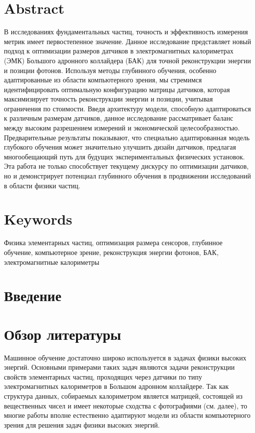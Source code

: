 \documentclass[a4paper,12pt]{extarticle}
\begin{document}
\section*{Abstract}   %
В исследованиях фундаментальных частиц, точность и эффективность измерения метрик имеет первостепенное значение. Данное исследование представляет новый подход к оптимизации размеров датчиков в электромагнитных калориметрах (ЭМК) Большого адронного коллайдера (БАК) для точной реконструкции энергии и позиции фотонов. Используя методы глубинного обучения, особенно адаптированные из области компьютерного зрения, мы стремимся идентифицировать оптимальную конфигурацию матрицы датчиков, которая максимизирует точность реконструкции энергии и позиции, учитывая ограничения по стоимости. Введя архитектуру модели, способную адаптироваться к различным размерам датчиков, данное исследование рассматривает баланс между высоким разрешением измерений и экономической целесообразностью. Предварительные результаты показывают, что специально адаптированная модель глубокого обучения может значительно улучшить дизайн датчиков, предлагая многообещающий путь для будущих экспериментальных физических установок. Эта работа не только способствует текущему дискурсу по оптимизации датчиков, но и демонстрирует потенциал глубинного обучения в продвижении исследований в области физики частиц.


\section*{Keywords}
Физика элементарных частиц, оптимизация размера сенсоров, глубинное обучение, компьютерное зрение, реконструкция энергии фотонов, БАК, электромагнитные калориметры

\pagebreak

\section{Введение}



\section{Обзор литературы}

Машинное обучение достаточно широко используется в задачах физики высоких энергий. Основными примерами таких задач являются задачи реконструкции свойств элементарных частиц, проходящих через датчики по типу электромагнитных калориметров в Большом адронном коллайдере. Так как структура данных, собираемых калориметром является матрицей, состоящей из вещественных чисел и имеет некоторые сходства с фотографиями (см. далее), то многие работы вполне естественно адаптируют модели из области компьютерного зрения для решения задач физики высоких энергий.
\end{document}
